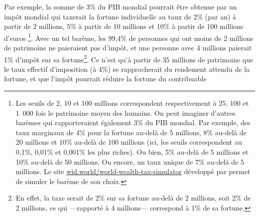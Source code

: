 \documentclass[a5paper,french]{memoir}
\begin{document}
Par exemple, la somme de 3\% du PIB mondial pourrait être obtenue par un impôt mondial qui taxerait la fortune individuelle au taux de 2\% (par an) à partir de 2 millions, 5\% à partir de 10 millions et 10\% à partir de 100 millions d'euros
\footnote{Les seuils de 2, 10 et 100 millions correspondent respectivement à 25, 100 et 1~000 fois le patrimoine moyen des humains. On peut imaginer d'autres barèmes qui rapporteraient également 3\% du PIB mondial. Par exemple, des taux marginaux de 4\% pour la fortune au-delà de 5 millions, 8\% au-delà de 20 millions et 10\% au-delà de 100 millions (ici, les seuils correspondent au 0,1\%, 0,01\% et 0,001\% les plus riches). Ou bien, 5\% au-delà de 5 millions et 10\% au-delà de 50 millions. Ou encore, un taux unique de 7\% au-delà de 5 millions. Le site \href{https://wid.world/world-wealth-tax-simulator/}{wid.world/world-wealth-tax-simulator} développé par \cite{chancel_world_2022} permet de simuler le barème de son choix.}. %
Avec un tel barème, les 99,4\% de personnes qui ont moins de 2 millions de patrimoine ne paieraient pas d'impôt, et une personne avec 4 millions paierait 1\% d'impôt sur sa fortune\footnote{En effet, la taxe serait de 2\% sur sa fortune au-delà de 2 millions, soit 2\% de 2 millions, ce qui ---rapporté à 4 millions--- correspond à 1\% de sa fortune.}. Ce n'est qu'à partir de 35 millions de patrimoine que le taux effectif d'imposition (à 4\%) se rapprocherait du rendement attendu de la fortune, et que l'impôt pourrait réduire la fortune du contribuable
\end{document}

